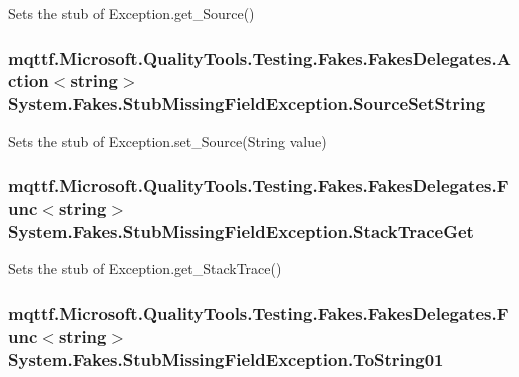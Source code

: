 Sets the stub of Exception.\-get\-\_\-\-Source()

\hypertarget{class_system_1_1_fakes_1_1_stub_missing_field_exception_ababec29f2cdcd2b476f10690f5dd0579}{
\subsubsection[{Source\-Set\-String}]{\setlength{\rightskip}{0pt plus 5cm}mqttf.\-Microsoft.\-Quality\-Tools.\-Testing.\-Fakes.\-Fakes\-Delegates.\-Action$<$string$>$ System.\-Fakes.\-Stub\-Missing\-Field\-Exception.\-Source\-Set\-String}}\label{class_system_1_1_fakes_1_1_stub_missing_field_exception_ababec29f2cdcd2b476f10690f5dd0579}


Sets the stub of Exception.\-set\-\_\-\-Source(\-String value)

\hypertarget{class_system_1_1_fakes_1_1_stub_missing_field_exception_a5f655344584f68d70d922eb7ae5fd46d}{
\subsubsection[{Stack\-Trace\-Get}]{\setlength{\rightskip}{0pt plus 5cm}mqttf.\-Microsoft.\-Quality\-Tools.\-Testing.\-Fakes.\-Fakes\-Delegates.\-Func$<$string$>$ System.\-Fakes.\-Stub\-Missing\-Field\-Exception.\-Stack\-Trace\-Get}}\label{class_system_1_1_fakes_1_1_stub_missing_field_exception_a5f655344584f68d70d922eb7ae5fd46d}


Sets the stub of Exception.\-get\-\_\-\-Stack\-Trace()

\hypertarget{class_system_1_1_fakes_1_1_stub_missing_field_exception_adec10e9d5b9cd5fc534bc11045cec13b}{
\subsubsection[{To\-String01}]{\setlength{\rightskip}{0pt plus 5cm}mqttf.\-Microsoft.\-Quality\-Tools.\-Testing.\-Fakes.\-Fakes\-Delegates.\-Func$<$string$>$ System.\-Fakes.\-Stub\-Missing\-Field\-Exception.\-To\-String01}}\label{class_system_1_1_fakes_1_1_stub_missing_field_exception_adec10e9d5b9cd5fc534bc11045cec13b}


